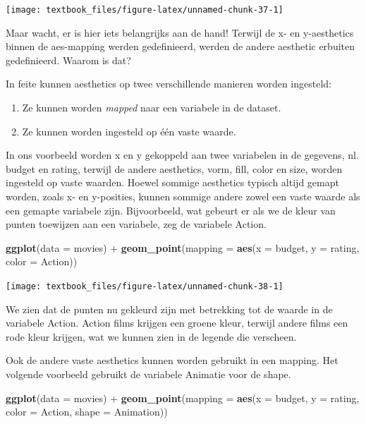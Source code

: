 \documentclass[]{tufte-book}
\newenvironment{Shaded}{}{}
\newcommand{\DataTypeTok}[1]{\textcolor[rgb]{0.56,0.13,0.00}{#1}}
\newcommand{\KeywordTok}[1]{\textcolor[rgb]{0.00,0.44,0.13}{\textbf{#1}}}
\newcommand{\NormalTok}[1]{#1}
\newcommand{\OperatorTok}[1]{\textcolor[rgb]{0.40,0.40,0.40}{#1}}
\newcommand{\StringTok}[1]{\textcolor[rgb]{0.25,0.44,0.63}{#1}}
\providecommand{\tightlist}{%
  \setlength{\itemsep}{0pt}\setlength{\parskip}{0pt}}
\begin{document}
\texttt{[image: textbook\_files/figure-latex/unnamed-chunk-37-1]}

Maar wacht, er is hier iets belangrijks aan de hand! Terwijl de x- en y-aesthetics binnen de aes-mapping werden gedefinieerd, werden de andere aesthetic erbuiten gedefinieerd. Waarom is dat?

In feite kunnen aesthetics op twee verschillende manieren worden ingesteld:

\begin{enumerate}
\def\labelenumi{\arabic{enumi}.}
\tightlist
\item
  Ze kunnen worden \emph{mapped} naar een variabele in de dataset.
\item
  Ze kunnen worden ingesteld op één vaste waarde.
\end{enumerate}

In ons voorbeeld worden x en y gekoppeld aan twee variabelen in de gegevens, nl. budget en rating, terwijl de andere aesthetics, vorm, fill, color en size, worden ingesteld op vaste waarden. Hoewel sommige aesthetics typisch altijd gemapt worden, zoals x- en y-posities, kunnen sommige andere zowel een vaste waarde als een gemapte variabele zijn. Bijvoorbeeld, wat gebeurt er als we de kleur van punten toewijzen aan een variabele, zeg de variabele Action.

\begin{Shaded}
\begin{Highlighting}[]
\KeywordTok{ggplot}\NormalTok{(}\DataTypeTok{data =}\NormalTok{ movies) }\OperatorTok{+}
\StringTok{    }\KeywordTok{geom_point}\NormalTok{(}\DataTypeTok{mapping =} \KeywordTok{aes}\NormalTok{(}\DataTypeTok{x =}\NormalTok{ budget, }
                             \DataTypeTok{y =}\NormalTok{ rating, }
                             \DataTypeTok{color =}\NormalTok{ Action))}
\end{Highlighting}
\end{Shaded}

\texttt{[image: textbook\_files/figure-latex/unnamed-chunk-38-1]}

We zien dat de punten nu gekleurd zijn met betrekking tot de waarde in de variabele Action. Action films krijgen een groene kleur, terwijl andere films een rode kleur krijgen, wat we kunnen zien in de legende die verscheen.

Ook de andere vaste aesthetics kunnen worden gebruikt in een mapping. Het volgende voorbeeld gebruikt de variabele Animatie voor de shape.

\begin{Shaded}
\begin{Highlighting}[]
\KeywordTok{ggplot}\NormalTok{(}\DataTypeTok{data =}\NormalTok{ movies) }\OperatorTok{+}
\StringTok{    }\KeywordTok{geom_point}\NormalTok{(}\DataTypeTok{mapping =} \KeywordTok{aes}\NormalTok{(}\DataTypeTok{x =}\NormalTok{ budget, }
                             \DataTypeTok{y =}\NormalTok{ rating, }
                             \DataTypeTok{color =}\NormalTok{ Action, }
                              \DataTypeTok{shape =}\NormalTok{ Animation))}
\end{Highlighting}
\end{Shaded}
\end{document}
